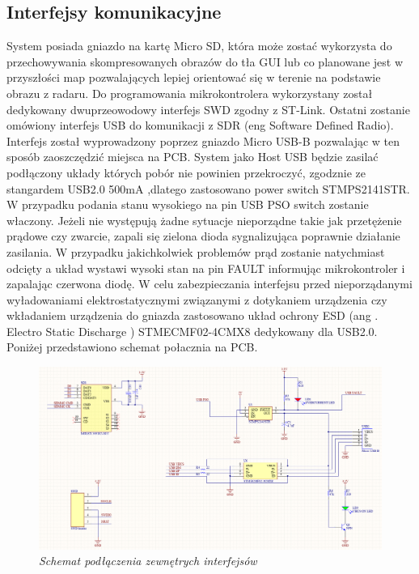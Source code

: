 \documentclass[eng,printmode]{mgr}
\begin{document}
\subsection{Interfejsy komunikacyjne}
System posiada gniazdo na kartę Micro SD, która może zostać wykorzysta do przechowywania skompresowanych obrazów do tła GUI lub co planowane jest w przyszłości map pozwalających lepiej orientować się w terenie na podstawie obrazu z radaru. Do programowania mikrokontrolera wykorzystany został dedykowany dwuprzeowodowy interfejs SWD zgodny z ST-Link. Ostatni zostanie omówiony interfejs USB do komunikacji z SDR (eng Software Defined Radio). Interfejs został wyprowadzony poprzez gniazdo Micro USB-B pozwalając w ten sposób zaoszczędzić miejsca na PCB. System jako Host USB będzie zasilać podłączony układy których pobór nie powinien przekroczyć, zgodznie ze stangardem USB2.0 500mA ,dlatego zastosowano power switch STMPS2141STR. W przypadku podania stanu wysokiego na pin USB PSO switch zostanie właczony. Jeżeli nie występują żadne sytuacje nieporządne takie jak przetężenie prądowe czy zwarcie, zapali się zielona dioda sygnalizująca poprawnie działanie zasilania. W przypadku jakichkolwiek problemów prąd zostanie natychmiast odcięty a układ wystawi wysoki stan na pin FAULT informując mikrokontroler i zapalając czerwona diodę. W celu zabezpieczania interfejsu przed nieporządanymi wyładowaniami elektrostatycznymi związanymi z dotykaniem urządzenia czy wkładaniem urządzenia do gniazda zastosowano układ ochrony ESD (ang . Electro Static Discharge ) STMECMF02-4CMX8 dedykowany dla USB2.0. Poniżej przedstawiono schemat połacznia na PCB.

\begin{figure}[!h]
    \centering
    \includegraphics[width=\textwidth]{schematics/conn.png}
    \caption{\textit{\scriptsize Schemat podłączenia zewnętrych interfejsów}}
\end{figure}
\end{document}
